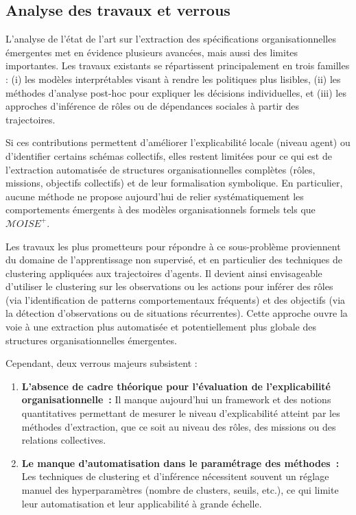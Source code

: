 \subsection*{Analyse des travaux et verrous}

L'analyse de l'état de l'art sur l'extraction des spécifications organisationnelles émergentes met en évidence plusieurs avancées, mais aussi des limites importantes. Les travaux existants se répartissent principalement en trois familles : (i) les modèles interprétables visant à rendre les politiques plus lisibles, (ii) les méthodes d'analyse post-hoc pour expliquer les décisions individuelles, et (iii) les approches d'inférence de rôles ou de dépendances sociales à partir des trajectoires.

Si ces contributions permettent d'améliorer l'explicabilité locale (niveau agent) ou d'identifier certains schémas collectifs, elles restent limitées pour ce qui est de l'extraction automatisée de structures organisationnelles complètes (rôles, missions, objectifs collectifs) et de leur formalisation symbolique. En particulier, aucune méthode ne propose aujourd'hui de relier systématiquement les comportements émergents à des modèles organisationnels formels tels que $\mathcal{M}OISE^+$.

Les travaux les plus prometteurs pour répondre à ce sous-problème proviennent du domaine de l'apprentissage non supervisé, et en particulier des techniques de clustering appliquées aux trajectoires d'agents. Il devient ainsi envisageable d'utiliser le clustering sur les observations ou les actions pour inférer des rôles (via l'identification de patterns comportementaux fréquents) et des objectifs (via la détection d'observations ou de situations récurrentes). Cette approche ouvre la voie à une extraction plus automatisée et potentiellement plus globale des structures organisationnelles émergentes.

Cependant, deux verrous majeurs subsistent :
\begin{enumerate}
  \item \textbf{L'absence de cadre théorique pour l'évaluation de l'explicabilité organisationnelle~:} Il manque aujourd'hui un framework et des notions quantitatives permettant de mesurer le niveau d'explicabilité atteint par les méthodes d'extraction, que ce soit au niveau des rôles, des missions ou des relations collectives.
  \item \textbf{Le manque d'automatisation dans le paramétrage des méthodes~:} Les techniques de clustering et d'inférence nécessitent souvent un réglage manuel des hyperparamètres (nombre de clusters, seuils, etc.), ce qui limite leur automatisation et leur applicabilité à grande échelle.
\end{enumerate}

